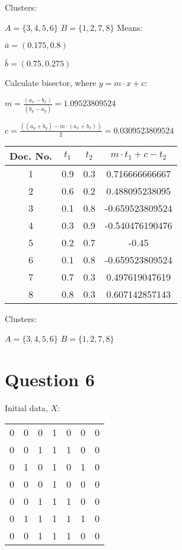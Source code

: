 \documentclass[11pt]{article}
\begin{document}
Clusters:

$A = \{3,4,5,6\}$
$B = \{1,2,7,8\}$
Means:

$\bar{a} = (0.175, 0.8)$

$\bar{b} = (0.75, 0.275)$

Calculate bisector, where $y = m \cdot x + c$:

$m = \frac{(a_x - b_x)}{(b_y - a_y)} = 1.09523809524$

$c = \frac{((a_y+b_y) - m \cdot (a_x+b_x))}{2} = 0.0309523809524$

\begin{tabular}{c | c | c | c}
Doc. No. & $t_1$ & $t_2$ & $m \cdot t_1 + c - t_2$ \\
\hline
1 & 0.9 & 0.3 & 0.716666666667 \\
2 & 0.6 & 0.2 & 0.488095238095 \\
3 & 0.1 & 0.8 & -0.659523809524 \\
4 & 0.3 & 0.9 & -0.540476190476 \\
5 & 0.2 & 0.7 & -0.45 \\
6 & 0.1 & 0.8 & -0.659523809524 \\
7 & 0.7 & 0.3 & 0.497619047619 \\
8 & 0.8 & 0.3 & 0.607142857143 \\
\end{tabular}

Clusters:

$A = \{3,4,5,6\}$
$B = \{1,2,7,8\}$



\section*{Question 6}


Initial data, $X$:

\begin{tabular}{c c c c c c c}
0 & 0 & 0 & 1 & 0 & 0 & 0 \\
0 & 0 & 1 & 1 & 1 & 0 & 0 \\
0 & 1 & 0 & 1 & 0 & 1 & 0 \\
0 & 0 & 0 & 1 & 0 & 0 & 0 \\
0 & 0 & 1 & 1 & 1 & 0 & 0 \\
0 & 1 & 1 & 1 & 1 & 1 & 0 \\
0 & 0 & 1 & 1 & 1 & 0 & 0 \\
\end{tabular}
\end{document}

